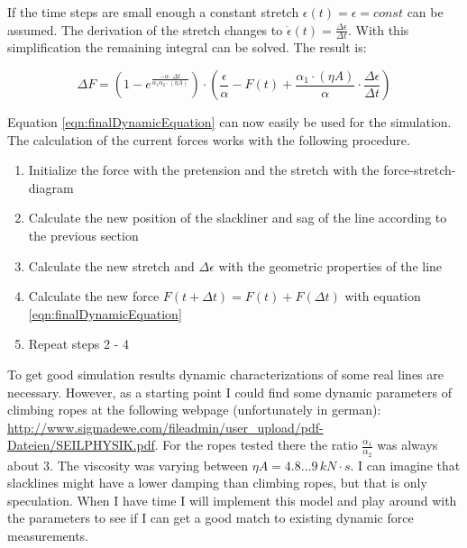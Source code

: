  If the time steps are small enough a constant stretch $\epsilon(t) = \epsilon = const$ can be assumed. The derivation of the stretch changes to $\dot{\epsilon}(t) = \frac{\Delta\epsilon}{\Delta t}$. With this simplification the remaining integral can be solved.
The result is:

\begin{equation}
	\Delta F = \left( 1 - e^{\frac{-\alpha\cdot\Delta t}{\alpha_1\alpha_2\cdot (\eta A)}} \right) \cdot \left( \frac{\epsilon}{\alpha} - F(t) + \frac{\alpha_1\cdot (\eta A)}{\alpha} \cdot \frac{\Delta\epsilon}{\Delta t} \right)
	\label{eqn:finalDynamicEquation}
\end{equation}

Equation \ref{eqn:finalDynamicEquation} can now easily be used for the simulation. The calculation of the current forces works with the following procedure.

\begin{enumerate}
	\item Initialize the force with the pretension and the stretch with the force-stretch-diagram
	\item Calculate the new position of the slackliner and sag of the line according to the previous section
	\item Calculate the new stretch and $\Delta\epsilon$ with the geometric properties of the line
	\item Calculate the new force $F(t+\Delta t) = F(t) + F(\Delta t)$ with equation \ref{eqn:finalDynamicEquation}
	\item Repeat steps 2 - 4
\end{enumerate}


To get good simulation results dynamic characterizations of some real lines are necessary. However, as a starting point I could find some dynamic parameters of climbing ropes at the following webpage (unfortunately in german): \url{http://www.sigmadewe.com/fileadmin/user_upload/pdf-Dateien/SEILPHYSIK.pdf}.
For the ropes tested there the ratio $\frac{\alpha_1}{\alpha_2}$ was always about $3$. The viscosity was varying between $\eta A = 4.8 \dots 9\,kN\cdot s$. I can imagine that slacklines might have a lower damping than climbing ropes, but that is only speculation. When I have time I will implement this model and play around with the parameters to see if I can get a good match to existing dynamic force measurements.
